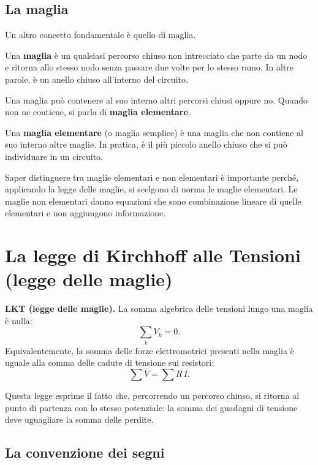 \subsection{La maglia}

Un altro concetto fondamentale è quello di maglia.

\begin{concetto}
Una \textbf{maglia} è un qualsiasi percorso chiuso non intrecciato che parte da un nodo e ritorna allo stesso nodo senza passare due volte per lo stesso ramo. In altre parole, è un anello chiuso all'interno del circuito.
\end{concetto}

Una maglia può contenere al suo interno altri percorsi chiusi oppure no. Quando non ne contiene, si parla di \textbf{maglia elementare}.

\begin{concetto}
Una \textbf{maglia elementare} (o maglia semplice) è una maglia che non contiene al suo interno altre maglie. In pratica, è il più piccolo anello chiuso che si può individuare in un circuito.
\end{concetto}

\begin{attenzione}
Saper distinguere tra maglie elementari e non elementari è importante perché, applicando la legge delle maglie, si scelgono di norma le maglie elementari. Le maglie non elementari danno equazioni che sono combinazione lineare di quelle elementari e non aggiungono informazione.
\end{attenzione}

\section{La legge di Kirchhoff alle Tensioni (legge delle maglie)}

\begin{concetto}
\textbf{LKT (legge delle maglie).} La somma algebrica delle tensioni lungo una maglia è nulla:
\[
\sum_k V_k = 0.
\]
Equivalentemente, la somma delle forze elettromotrici presenti nella maglia è uguale alla somma delle cadute di tensione sui resistori:
\[
\sum V = \sum R\,I.
\]
\end{concetto}

Questa legge esprime il fatto che, percorrendo un percorso chiuso, si ritorna al punto di partenza con lo stesso potenziale: la somma dei guadagni di tensione deve uguagliare la somma delle perdite.

\subsection{La convenzione dei segni}

